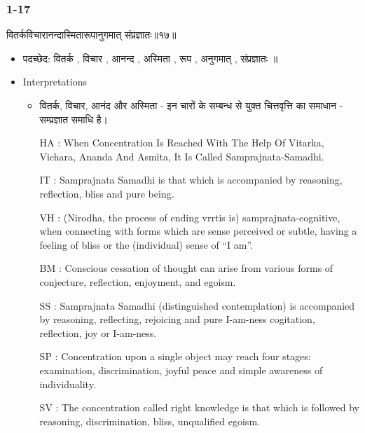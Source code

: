 \begin{frame}[fragile]\frametitle{1-17}
\begin{sanskrit}
वितर्कविचारानन्दास्मितारूपानुगमात् संप्रज्ञातः॥१७॥
\end{sanskrit}

	\begin{itemize}
	\item पदच्छेद: वितर्क , विचार , आनन्द , अस्मिता , रूप , अनुगमात् , संप्रज्ञातः ॥
	\item Interpretations
		\begin{itemize}		
		\item वितर्क, विचार, आनंद और अस्मिता - इन चारों के सम्बन्ध से युक्त चित्तवृत्ति का समाधान - सम्प्रज्ञात समाधि है।
		\item [HA]: When Concentration Is Reached With The Help Of Vitarka, Vichara, Ananda And Asmita, It Is Called Samprajnata-Samadhi.
		\item [IT]: Samprajnata Samadhi is that which is accompanied by reasoning, reflection, bliss and pure being.
		\item [VH]: (Nirodha, the process of ending vrrtis is) samprajnata-cognitive, when connecting with forms which are sense perceived or subtle, having a feeling of bliss or the (individual) sense of “I am”.
		\item [BM]: Conscious cessation of thought can arise from various forms of conjecture, reflection, enjoyment, and egoism.
		\item [SS]: Samprajnata Samadhi (distinguished contemplation) is accompanied by reasoning, reflecting, rejoicing and pure I-am-ness cogitation, reflection, joy or I-am-ness.
		\item [SP]: Concentration upon a single object may reach four stages: examination, discrimination, joyful peace and simple awareness of individuality.
		\item [SV]: The concentration called right knowledge is that which is followed by reasoning, discrimination, bliss, unqualified egoism. 
		\end{itemize}
	\end{itemize}
	
\end{frame}

